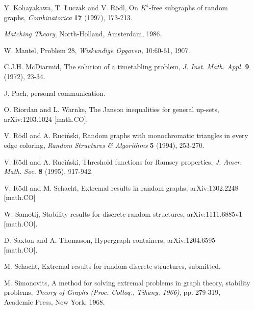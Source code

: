 \documentclass[letterpaper,11pt]{article}
\newcommand{\0}[0]{\emptyset}
\begin{document}
\begin{thebibliography}{99}
 Y. Kohayakawa, T. \L uczak and V. R\"odl,
On $K^4$-free subgraphs of random graphs,
{\em Combinatorica} {\bf 17} (1997), 173-213.


{\em Matching Theory}, North-Holland, Amsterdam, 1986.


 W. Mantel, Problem 28, {\em Wiskundige Opgaven,}
10:60-61, 1907.

C.J.H. McDiarmid,  The solution of a timetabling problem,
{\em J. Inst. Math. Appl.} {\bf 9} (1972), 23-34.


J. Pach, personal communication.

 O. Riordan and L. Warnke,
The Janson inequalities for general up-sets,
arXiv:1203.1024 [math.CO].




  V. R\"odl and A. Ruci\'nski,
Random graphs with monochromatic triangles in every edge coloring,
{\em Random Structures \& Algorithms}
{\bf 5} (1994), 253-270.


  V. R\"odl and A. Ruci\'nski,
Threshold functions for Ramsey properties,
{\em J. Amer. Math. Soc.}
{\bf 8} (1995), 917-942.

  V. R\"odl and M. Schacht,
Extremal results in random graphs,
arXiv:1302.2248 [math.CO]



W. Samotij, Stability results for discrete random structures, arXiv:1111.6885v1 [math.CO].

D. Saxton and A. Thomason, Hypergraph containers,
 arXiv:1204.6595 [math.CO].

 M. Schacht,
Extremal results for random discrete structures,
submitted.

M. Simonovits,
A method for solving extremal problems in graph theory, stability problems,
{\em Theory of Graphs (Proc. Colloq., Tihany, 1966)}, pp. 279-319, Academic Press, New York, 1968.




\end{thebibliography}
\end{document}
